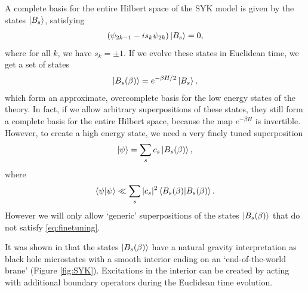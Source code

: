 \documentclass[12pt]{article}
\begin{document}
A complete basis for the entire Hilbert space of the SYK model is given by the states $\ket{B_s}$, satisfying
\begin{align}
\left(\psi_{2k-1} - i s_k \psi_{2k} \right) \ket{B_s} = 0,
\end{align}
where for all $k$, we have $s_k = \pm 1$. If we evolve these states in Euclidean time, we get a set of states
\begin{align}
\ket{B_s (\beta)} = e^{-\beta H / 2} \ket{B_s},
\end{align}
which form an approximate, overcomplete basis for the low energy states of the theory. In fact, if we allow arbitrary superpositions of these states, they still form a complete basis for the entire Hilbert space, because the map $e^{-\beta H}$ is invertible. However, to create a high energy state, we need a very finely tuned superposition
\begin{align}
\ket{\psi} = \sum_s c_s \ket{B_s (\beta)},
\end{align}
where
\begin{align} \label{eq:finetuning}
\braket{\psi|\psi} \ll \sum_s |c_s|^2 \braket{B_s (\beta) |B_s (\beta)}.
\end{align}
However we will only allow `generic' superpositions of the states $\ket{B_s (\beta)}$ that do not satisfy \eqref{eq:finetuning}.

It was shown in \cite{kourkoulou2017pure} that the states $\ket{B_s (\beta)}$ have a natural gravity interpretation as black hole microstates with a smooth interior ending on an `end-of-the-world brane' (Figure \ref{fig:SYK}). Excitations in the interior can be created by acting with additional boundary operators during the Euclidean time evolution. 
\end{document}
